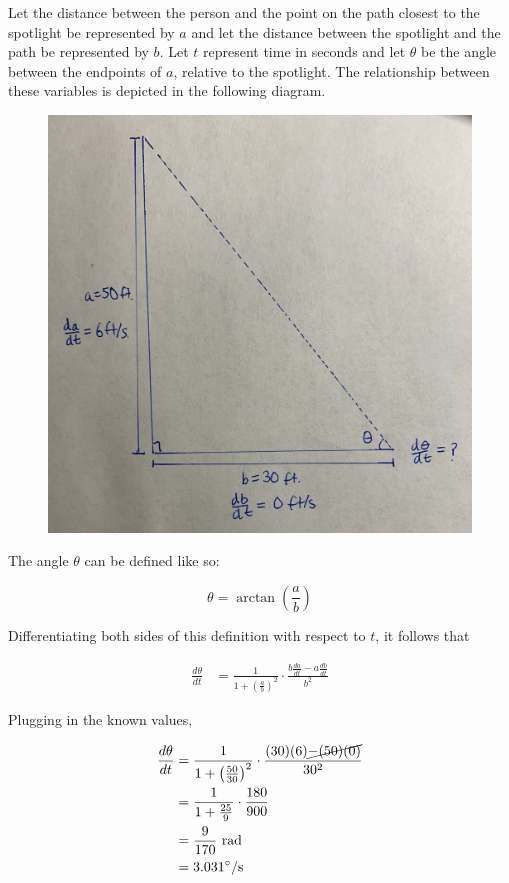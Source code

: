 \documentclass{article}
\begin{document}
    Let the distance between the person and the point on the path closest to the spotlight be represented by $a$ and let the distance between the spotlight and the path be represented by $b$. Let $t$ represent time in
    seconds and let $\theta$ be the angle between the endpoints of $a$, relative to the spotlight. The relationship between these variables is depicted in the following diagram.
    
    \begin{figure}[hbt!]
        \centering
        \includegraphics[scale=0.075]{spotlight}
    \end{figure}

    The angle $\theta$ can be defined like so:

    \[
        \theta = \arctan{\left(\frac{a}{b}\right)}
    \]

    Differentiating both sides of this definition with respect to $t$, it follows that

    \begin{align*}
        \frac{d\theta}{dt}  &= \frac{1}{1+\left(\frac{a}{b}\right)^2}\cdot\frac{b\frac{da}{dt}-a\frac{db}{dt}}{b^2}
    \end{align*}

    Plugging in the known values,

    \begin{align*}
        \frac{d\theta}{dt}  &= \frac{1}{1+\left(\frac{50}{30}\right)^2}\cdot\frac{(30)(6)\cancel{-(50)(0)}}{30^2} \\
                            &= \frac{1}{1+\frac{25}{9}}\cdot\frac{180}{900} \\
                            &= \frac{9}{170} \text{ rad} \\
                            &= 3.031^{\circ}\text{/s}
    \end{align*}
\end{document}

